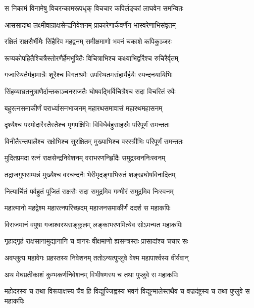 
\twolineshloka
{स निकामं विनामेषु विचरन्कामरूपधृक्}
{विचचार कपिर्लङ्कां लाघवेन समन्वितः} %

\twolineshloka
{आससादाथ लक्ष्मीवान्राक्षसेन्द्रनिवेशनम्}
{प्राकारेणार्कवर्णेन भास्वरेणाभिसंवृतम्} %

\twolineshloka
{रक्षितं राक्षसैर्भीमैः सिंहैरिव महद्वनम्}
{समीक्षमाणो भवनं चकाशे कपिकुञ्जरः} %

\twolineshloka
{रूप्यकोपहितैश्चित्रैस्तोरणैर्हेमभूषितैः}
{विचित्राभिश्च कक्ष्याभिर्द्वारैश्च रुचिरैर्वृतम्} %

\twolineshloka
{गजास्थितैर्महामात्रैः शूरैश्च विगतश्रमैः}
{उपस्थितमसंहार्यैर्हयैः स्यन्दनयायिभिः} %

\twolineshloka
{सिंहव्याघ्रतनुत्राणैर्दान्तकाञ्चनराजतैः}
{घोषवद्भिर्विचित्रैश्च सदा विचरितं रथैः} %

\twolineshloka
{बहुरत्नसमाकीर्णं परार्ध्यासनभाजनम्}
{महारथसमावासं महारथमहासनम्} %

\twolineshloka
{दृश्यैश्च परमोदारैस्तैस्तैश्च मृगपक्षिभिः}
{विविधैर्बहुसाहस्रैः परिपूर्णं समन्ततः} %

\twolineshloka
{विनीतैरन्तपालैश्च रक्षोभिश्च सुरक्षितम्}
{मुख्याभिश्च वरस्त्रीभिः परिपूर्णं समन्ततः} %

\twolineshloka
{मुदितप्रमदा रत्नं राक्षसेन्द्रनिवेशनम्}
{वराभरणनिर्ह्रादैः समुद्रस्वननिःस्वनम्} %

\twolineshloka
{तद्राजगुणसम्पन्नं मुख्यैश्च वरचन्दनैः}
{भेरीमृदङ्गाभिरुतं शङ्खघोषविनादितम्} %

\twolineshloka
{नित्यार्चितं पर्वहुतं पूजितं राक्षसैः सदा}
{समुद्रमिव गम्भीरं समुद्रमिव निःस्वनम्} %

\twolineshloka
{महात्मानो महद्वेश्म महारत्नपरिच्छदम्}
{महाजनसमाकीर्णं ददर्श स महाकपिः} %

\twolineshloka
{विराजमानं वपुषा गजाश्वरथसङ्कुलम्}
{लङ्काभरणमित्येव सोऽमन्यत महाकपिः} %

\twolineshloka
{गृहाद्गृहं राक्षसानामुद्यानानि च वानरः}
{वीक्षमाणो ह्यसन्त्रस्तः प्रासादांश्च चचार सः} %

\twolineshloka
{अवप्लुत्य महावेगः प्रहस्तस्य निवेशनम्}
{ततोऽन्यत्पुप्लुवे वेश्म महापार्श्वस्य वीर्यवान्} %

\twolineshloka
{अथ मेघप्रतीकाशं कुम्भकर्णनिवेशनम्}
{विभीषणस्य च तथा पुप्लुवे स महाकपिः} %

\threelineshloka
{महोदरस्य च तथा विरूपाक्षस्य चैव हि}
{विद्युज्जिह्वस्य भवनं विद्युन्मालेस्तथैव च}
{वज्रदंष्ट्रस्य च तथा पुप्लुवे स महाकपिः} %

